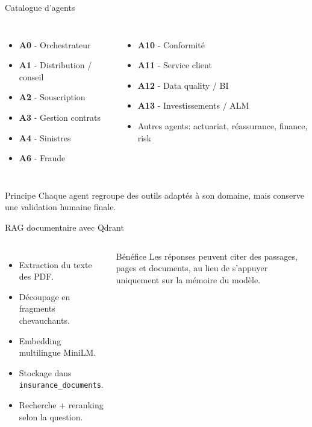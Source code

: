 \documentclass[aspectratio=169]{beamer}
\begin{document}
\begin{frame}{Catalogue d'agents}
  \begin{columns}[T]
      \begin{itemize}
        \item \textbf{A0} - Orchestrateur
        \item \textbf{A1} - Distribution / conseil
        \item \textbf{A2} - Souscription
        \item \textbf{A3} - Gestion contrats
        \item \textbf{A4} - Sinistres
        \item \textbf{A6} - Fraude
      \end{itemize}
      \begin{itemize}
        \item \textbf{A10} - Conformité
        \item \textbf{A11} - Service client
        \item \textbf{A12} - Data quality / BI
        \item \textbf{A13} - Investissements / ALM
        \item Autres agents: actuariat, réassurance, finance, risk
      \end{itemize}
  \end{columns}
  \vspace{0.4em}
  \begin{block}{Principe}
    Chaque agent regroupe des outils adaptés à son domaine, mais conserve une validation humaine finale.
  \end{block}
\end{frame}

\begin{frame}{RAG documentaire avec Qdrant}
  \begin{columns}[T]
      \begin{itemize}
        \item Extraction du texte des PDF.
        \item Découpage en fragments chevauchants.
        \item Embedding multilingue MiniLM.
        \item Stockage dans \texttt{insurance\_documents}.
        \item Recherche + reranking selon la question.
      \end{itemize}
      \begin{exampleblock}{Bénéfice}
        Les réponses peuvent citer des passages, pages et documents, au lieu de s'appuyer uniquement sur la mémoire du modèle.
      \end{exampleblock}
  \end{columns}
\end{frame}
\end{document}
